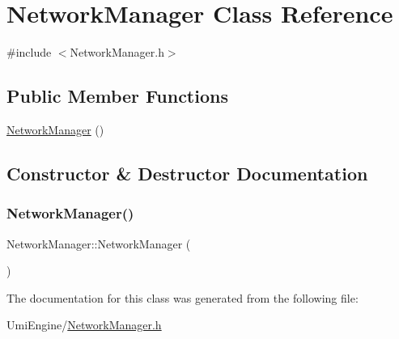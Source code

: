 \hypertarget{class_network_manager}{}\section{Network\+Manager Class Reference}
\label{class_network_manager}


{\ttfamily \#include $<$Network\+Manager.\+h$>$}

\subsection*{Public Member Functions}
\begin{DoxyCompactItemize}
\item 
\mbox{\hyperlink{class_network_manager_a5aaf71c4aa7a2efab7f1dbae02312280}{Network\+Manager}} ()
\end{DoxyCompactItemize}


\subsection{Constructor \& Destructor Documentation}
\mbox{\label{class_network_manager_a5aaf71c4aa7a2efab7f1dbae02312280}} 
\subsubsection{\texorpdfstring{NetworkManager()}{NetworkManager()}}
{\footnotesize\ttfamily Network\+Manager\+::\+Network\+Manager (\begin{DoxyParamCaption}{ }\end{DoxyParamCaption})}



The documentation for this class was generated from the following file\+:\begin{DoxyCompactItemize}
\item 
Umi\+Engine/\mbox{\hyperlink{_network_manager_8h}{Network\+Manager.\+h}}\end{DoxyCompactItemize}
